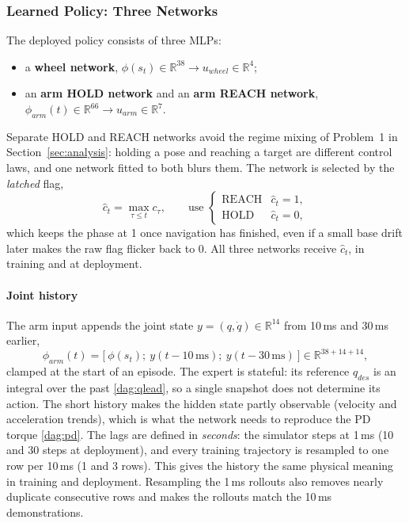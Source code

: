 \documentclass[conference]{IEEEtran}
\begin{document}
\subsubsection{Learned Policy: Three Networks}
\label{dag:policy}

The deployed policy consists of three MLPs:
\begin{itemize}
  \item a \textbf{wheel network}, $\phi(s_t)\in\mathbb{R}^{38}\to u_{wheel}\in\mathbb{R}^4$;
  \item an \textbf{arm HOLD network} and an \textbf{arm REACH network}, $\phi_{arm}(t)\in\mathbb{R}^{66}\to u_{arm}\in\mathbb{R}^7$.
\end{itemize}
Separate HOLD and REACH networks avoid the regime mixing of Problem~1 in Section~\ref{sec:analysis}: holding a pose and reaching a target are different control laws, and one network fitted to both blurs them. The network is selected by the \emph{latched} flag,
\begin{equation}
  \hat c_t=\max_{\tau\le t}c_\tau,\qquad
  \text{use }\begin{cases}\text{REACH}&\hat c_t=1,\\ \text{HOLD}&\hat c_t=0,\end{cases}
  \label{dag:latch}
\end{equation}
which keeps the phase at 1 once navigation has finished, even if a small base drift later makes the raw flag flicker back to 0. All three networks receive $\hat c_t$, in training and at deployment.

\paragraph{Joint history} The arm input appends the joint state $y=(q,\dot q)\in\mathbb{R}^{14}$ from 10\,ms and 30\,ms earlier,
\begin{equation}
  \phi_{arm}(t)=\bigl[\ \phi(s_t);\ y(t-10\,\text{ms});\ y(t-30\,\text{ms})\ \bigr]\in\mathbb{R}^{38+14+14},
  \label{dag:lags}
\end{equation}
clamped at the start of an episode. The expert is stateful: its reference $q_{des}$ is an integral over the past \eqref{dag:qlead}, so a single snapshot does not determine its action. The short history makes the hidden state partly observable (velocity and acceleration trends), which is what the network needs to reproduce the PD torque \eqref{dag:pd}. The lags are defined in \emph{seconds}: the simulator steps at 1\,ms (10 and 30 steps at deployment), and every training trajectory is resampled to one row per 10\,ms (1 and 3 rows). This gives the history the same physical meaning in training and deployment. Resampling the 1\,ms rollouts also removes nearly duplicate consecutive rows and makes the rollouts match the 10\,ms demonstrations.
\end{document}
